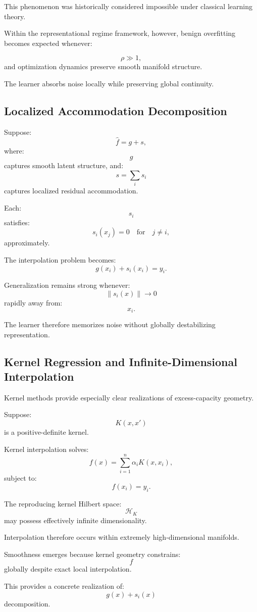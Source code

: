 \documentclass[12pt,a4paper]{article}
\begin{document}
This phenomenon was historically considered impossible under classical learning theory.

Within the representational regime framework, however, benign overfitting becomes expected whenever:

\[
\rho
\gg
1,
\]
and optimization dynamics preserve smooth manifold structure.

The learner absorbs noise locally while preserving global continuity.

\subsection{Localized Accommodation Decomposition}

Suppose:
\[
\hat{f}
=
g
+
s,
\]
where:
\[
g
\]
captures smooth latent structure,
and:
\[
s
=
\sum_i s_i
\]
captures localized residual accommodation.

Each:
\[
s_i
\]
satisfies:
\[
s_i(x_j)
=
0
\quad
\text{for}
\quad
j\neq i,
\]
approximately.

The interpolation problem becomes:
\[
g(x_i)+s_i(x_i)=y_i.
\]

Generalization remains strong whenever:
\[
\|s_i(x)\|
\rightarrow
0
\]
rapidly away from:
\[
x_i.
\]

The learner therefore memorizes noise without globally destabilizing representation.

\subsection{Kernel Regression and Infinite-Dimensional Interpolation}

Kernel methods provide especially clear realizations of excess-capacity geometry.

Suppose:
\[
K(x,x')
\]
is a positive-definite kernel.

Kernel interpolation solves:
\[
f(x)
=
\sum_{i=1}^n
\alpha_i
K(x,x_i),
\]
subject to:
\[
f(x_i)=y_i.
\]

The reproducing kernel Hilbert space:
\[
\mathcal{H}_K
\]
may possess effectively infinite dimensionality.

Interpolation therefore occurs within extremely high-dimensional manifolds.

Smoothness emerges because kernel geometry constrains:
\[
f
\]
globally despite exact local interpolation.

This provides a concrete realization of:
\[
g(x)
+
s_i(x)
\]
decomposition.
\end{document}
